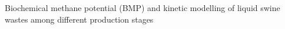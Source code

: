 Biochemical methane potential (BMP) and kinetic modelling of liquid swine wastes among different production stages